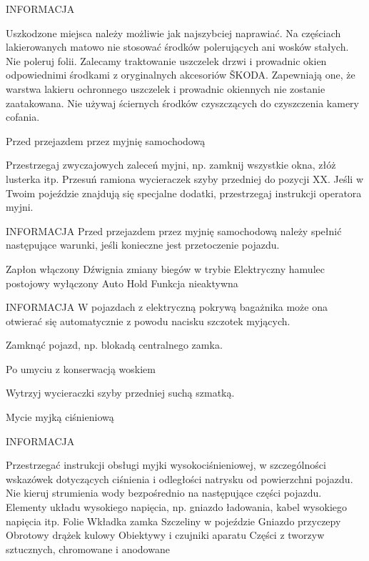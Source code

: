INFORMACJA
\begin{itemizeTriangle}
	\itemTriangle Uszkodzone miejsca należy możliwie jak najszybciej naprawiać.
	\itemTriangle Na częściach lakierowanych matowo nie stosować środków polerujących ani wosków stałych.
	\itemTriangle Nie poleruj folii.
	\itemTriangle Zalecamy traktowanie uszczelek drzwi i prowadnic okien odpowiednimi środkami z oryginalnych akcesoriów ŠKODA. Zapewniają one, że warstwa lakieru ochronnego uszczelek i prowadnic okiennych nie zostanie zaatakowana.
	\itemTriangle Nie używaj ściernych środków czyszczących do czyszczenia kamery cofania.
\end{itemizeTriangle}

Przed przejazdem przez myjnię samochodową
\begin{itemizeArrow}
	\itemArrow Przestrzegaj zwyczajowych zaleceń myjni, np. zamknij wszystkie okna, złóż lusterka itp.
	\itemArrow Przesuń ramiona wycieraczek szyby przedniej do pozycji XX.
	\itemArrow Jeśli w Twoim pojeździe znajdują się specjalne dodatki, przestrzegaj instrukcji operatora myjni.
\end{itemizeArrow}

INFORMACJA
Przed przejazdem przez myjnię samochodową należy spełnić następujące warunki, jeśli konieczne jest przetoczenie pojazdu.
\begin{itemizeTick}
	\itemTick Zapłon włączony
	\itemTick Dźwignia zmiany biegów w trybie \gearN
	\itemTick Elektryczny hamulec postojowy wyłączony
	\itemTick Auto Hold Funkcja nieaktywna
\end{itemizeTick}

INFORMACJA
W pojazdach z elektryczną pokrywą bagażnika może ona otwierać się automatycznie z powodu nacisku szczotek myjących.
\begin{itemizeTriangle}
	\itemTriangle Zamknąć pojazd, np. blokadą centralnego zamka.
\end{itemizeTriangle}

Po umyciu z konserwacją woskiem
\begin{itemizeArrow}
	\itemArrow Wytrzyj wycieraczki szyby przedniej suchą szmatką.
\end{itemizeArrow}

Mycie myjką ciśnieniową

INFORMACJA
\begin{itemizeTriangle}
	\itemTriangle Przestrzegać instrukcji obsługi myjki wysokociśnieniowej, w szczególności wskazówek dotyczących ciśnienia i odległości natrysku od powierzchni pojazdu.
	\itemTriangle Nie kieruj strumienia wody bezpośrednio na następujące części pojazdu.
	\itemTriangle Elementy układu wysokiego napięcia, np. gniazdo ładowania, kabel wysokiego napięcia itp.
	\itemTriangle Folie
	\itemTriangle Wkładka zamka
	\itemTriangle Szczeliny w pojeździe
	\itemTriangle Gniazdo przyczepy
	\itemTriangle Obrotowy drążek kulowy
	\itemTriangle Obiektywy i czujniki aparatu
	\itemTriangle Części z tworzyw sztucznych, chromowane i anodowane
\end{itemizeTriangle}

